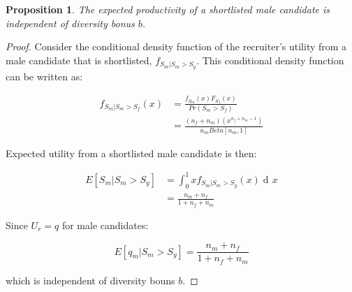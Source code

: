 \documentclass[11pt]{article}
\DeclareMathOperator{\di}{d\!}
\newtheorem{proposition}{Proposition}
\begin{document}
\begin{proposition}\label{prop_male_exp_qual}
    The expected productivity of a shortlisted male candidate is independent of diversity bonus $b$.
\end{proposition}
\begin{proof}
    Consider the conditional density function of the recruiter's utility from a male candidate that is shortlisted,  $f_{S_m|S_m>S_y}$. This conditional density function can be written as:

    \begin{align*}
        f_{S_m|S_m>S_f}(x) & = \frac{f_{S_m}(x)F_{S_f}(x) }{Pr(S_m > S_f)}     \\
                           & = \frac{(n_f+n_m)(x^{n_f+n_m-1})}{n_mBeta[n_m,1]}
    \end{align*}

    Expected utility from a shortlisted male candidate is then:

    \begin{align*}
        E[S_m|S_m > S_y] & = \int_0^1{xf_{S_m|S_m>S_y}(x) \di x} \\
                         & = \frac{n_m + n_f}{1+n_f+n_m}
    \end{align*}

    Since $U_r = q$ for male candidates:

    $$E[q_m|S_m > S_y] = \frac{n_m + n_f}{1+n_f+n_m}$$

    which is independent of diversity bouns $b$.
\end{proof}
\end{document}
